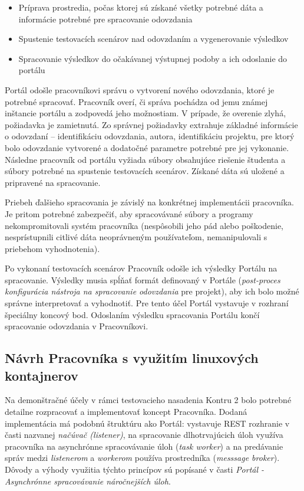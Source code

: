 \documentclass[
  digital, %
  twoside, %
  table,   %
  lof,     %
  lot,     %
]{fithesis3}
\begin{document}
\begin{itemize}
    \item Príprava prostredia, počas ktorej sú získané všetky potrebné dáta a informácie potrebné pre spracovanie odovzdania
    \item Spustenie testovacích scenárov nad odovzdaním a vygenerovanie výsledkov
    \item Spracovanie výsledkov do očakávanej výstupnej podoby a ich odoslanie do portálu
\end{itemize}

Portál odošle pracovníkovi správu o vytvorení nového odovzdania, ktoré je potrebné spracovať. Pracovník overí, či správa pochádza od jemu známej inštancie portálu a zodpovedá jeho možnostiam.  V prípade, že overenie zlyhá, požiadavka je zamietnutá. Zo správnej požiadavky extrahuje základné informácie o odovzdaní -- identifikáciu odovzdania, autora, identifikáciu projektu, pre ktorý bolo odovzdanie vytvorené a dodatočné parametre potrebné pre jej vykonanie. Následne pracovník od portálu vyžiada súbory obsahujúce riešenie študenta a súbory potrebné na spustenie testovacích scenárov. Získané dáta sú uložené a pripravené na spracovanie. 

Priebeh ďalšieho spracovania je závislý na konkrétnej implementácii pracovníka. Je pritom potrebné zabezpečiť, aby spracovávané súbory a programy nekompromitovali systém pracovníka (nespôsobili jeho pád alebo poškodenie, nesprístupnili citlivé dáta neoprávneným používateľom, nemanipulovali s priebehom vyhodnotenia). 

Po vykonaní testovacích scenárov Pracovník odošle ich výsledky Portálu na spracovanie. Výsledky musia spĺňať formát definovaný v Portále (\emph{post-proces konfigurácia nástroja na spracovanie odovzdania} pre projekt), aby ich bolo možné správne interpretovať a vyhodnotiť. Pre tento účel Portál vystavuje v rozhraní špeciálny koncový bod. Odoslaním výsledku spracovania Portálu končí spracovanie odovzdania v Pracovníkovi.

\subsection{Návrh Pracovníka s využitím linuxových kontajnerov}

Na demonštračné účely v rámci testovacieho nasadenia Kontru 2 bolo potrebné detailne rozpracovať a implementovať koncept Pracovníka. Dodaná implementácia má podobnú štruktúru ako Portál: vystavuje REST rozhranie v časti nazvanej \emph{načúvač (listener)}, na spracovanie dlhotrvajúcich úloh využíva pracovníka na asynchrónne spracovávanie úloh (\emph{task worker}) a na predávanie správ medzi \emph{listenerom} a \emph{workerom} používa prostredníka (\emph{messsage broker}). Dôvody a výhody využitia týchto princípov sú popísané v časti \emph{Portál - Asynchrónne spracovávanie náročnejších úloh}. 
\end{document}
